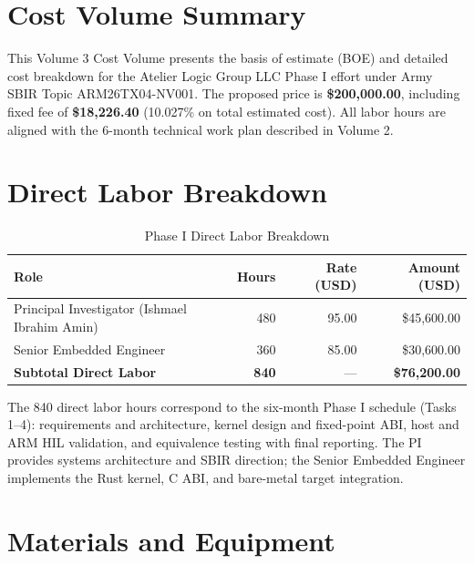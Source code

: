 \documentclass[10pt]{article}
\begin{document}
\vspace{0.5ex}

\section*{Cost Volume Summary}

This Volume 3 Cost Volume presents the basis of estimate (BOE) and detailed cost breakdown for the Atelier Logic Group LLC Phase I effort under Army SBIR Topic ARM26TX04-NV001. The proposed price is \textbf{\$200,000.00}, including fixed fee of \textbf{\$18,226.40} (10.027\% on total estimated cost). All labor hours are aligned with the 6-month technical work plan described in Volume 2.

\newpage

\section{Direct Labor Breakdown}

\begin{table}[H]
\centering
\small
\caption{Phase I Direct Labor Breakdown}
\label{tab:direct-labor}
\begin{tabular}{@{}lrrr@{}}
\toprule
\textbf{Role} & \textbf{Hours} & \textbf{Rate (USD)} & \textbf{Amount (USD)} \\
\midrule
Principal Investigator (Ishmael Ibrahim Amin) & 480 & 95.00 & \$45,600.00 \\
Senior Embedded Engineer & 360 & 85.00 & \$30,600.00 \\
\midrule
\textbf{Subtotal Direct Labor} & \textbf{840} & --- & \textbf{\$76,200.00} \\
\bottomrule
\end{tabular}
\end{table}

\smallskip
The 840 direct labor hours correspond to the six-month Phase I schedule (Tasks 1--4): requirements and architecture, kernel design and fixed-point ABI, host and ARM HIL validation, and equivalence testing with final reporting. The PI provides systems architecture and SBIR direction; the Senior Embedded Engineer implements the Rust kernel, C ABI, and bare-metal target integration.

\section{Materials and Equipment}
\end{document}
